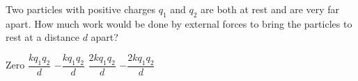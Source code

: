 \begin{questions}\setcounter{question}{27}\question
Two particles with positive charges $q_{1}$ and $q_{2}$ are both at rest and are very far apart. How much work would be done by external forces to bring the particles to rest at a distance $d$ apart?

\begin{oneparchoices}
\choice Zero
\choice $\dfrac{k q_{1} q_{2}}{d}$
\choice $-\dfrac{k q_{1} q_{2}}{d}$
\choice $\dfrac{2 k q_{1} q_{2}}{d}$
\choice $-\dfrac{2 k q_{1} q_{2}}{d}$
\end{oneparchoices}\end{questions}
